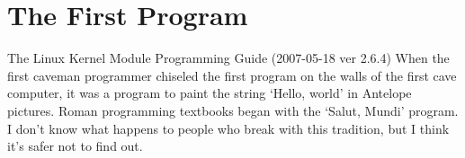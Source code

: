 \chapter{The First Program}
\label{sec:first}

\begin{inspiration}{The Linux Kernel Module Programming Guide (2007-05-18 ver 2.6.4)}
When the first caveman programmer chiseled the first program on the walls of the first cave computer, it was a program to paint the string `Hello, world' in Antelope pictures. Roman programming textbooks began with the `Salut, Mundi' program. I don't know what happens to people who break with this tradition, but I think it's safer not to find out.
\end{inspiration}


